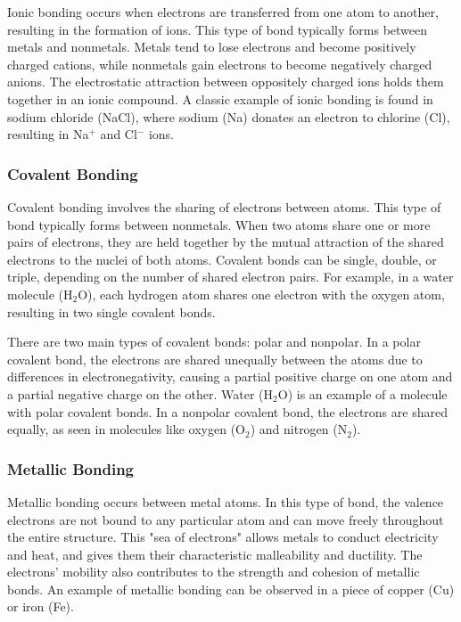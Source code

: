 \documentclass[10pt, roman]{article}
\begin{document}
Ionic bonding occurs when electrons are transferred from one atom to another, resulting in the formation of ions.
This type of bond typically forms between metals and nonmetals.
Metals tend to lose electrons and become positively charged cations, while nonmetals gain electrons to become negatively charged anions.
The electrostatic attraction between oppositely charged ions holds them together in an ionic compound.
A classic example of ionic bonding is found in sodium chloride (NaCl), where sodium (Na) donates an electron to chlorine (Cl), resulting in Na\(^+\) and Cl\(^-\) ions.

\subsubsection*{Covalent Bonding}

Covalent bonding involves the sharing of electrons between atoms.
This type of bond typically forms between nonmetals.
When two atoms share one or more pairs of electrons, they are held together by the mutual attraction of the shared electrons to the nuclei of both atoms.
Covalent bonds can be single, double, or triple, depending on the number of shared electron pairs.
For example, in a water molecule (H\(_2\)O), each hydrogen atom shares one electron with the oxygen atom, resulting in two single covalent bonds.

There are two main types of covalent bonds: polar and nonpolar.
In a polar covalent bond, the electrons are shared unequally between the atoms due to differences in electronegativity, causing a partial positive charge on one atom and a partial negative charge on the other.
Water (H\(_2\)O) is an example of a molecule with polar covalent bonds.
In a nonpolar covalent bond, the electrons are shared equally, as seen in molecules like oxygen (O\(_2\)) and nitrogen (N\(_2\)).

\subsubsection*{Metallic Bonding}

Metallic bonding occurs between metal atoms.
In this type of bond, the valence electrons are not bound to any particular atom and can move freely throughout the entire structure.
This "sea of electrons" allows metals to conduct electricity and heat, and gives them their characteristic malleability and ductility.
The electrons' mobility also contributes to the strength and cohesion of metallic bonds.
An example of metallic bonding can be observed in a piece of copper (Cu) or iron (Fe).
\end{document}
